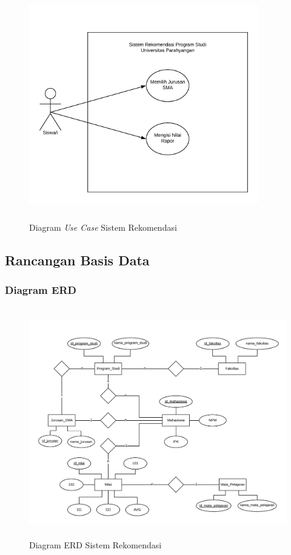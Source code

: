 \begin{enumerate}
    \begin{figure}[H]
        \centering
        \includegraphics[width = 10cm, height = 10cm]{doc/DokumenSkripsi/Gambar/gambar38.png}
        \caption{Diagram \textit{Use Case} Sistem Rekomendasi}
        \label{fig:diagram use case}
    \end{figure}
\end{enumerate}

\subsection{Rancangan Basis Data}
\label{rancangan basis data}

\subsubsection{Diagram ERD}
\label{diagram erd}

\begin{figure}[H]
    \centering
    \includegraphics[width = 12cm, height = 10cm ]{doc/DokumenSkripsi/Gambar/gambar37.png}
    \caption{Diagram ERD Sistem Rekomendasi}
    \label{fig:diagram erd}
\end{figure}

